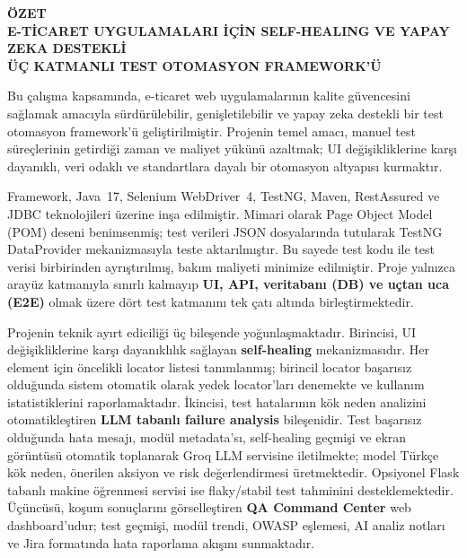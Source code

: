 
{}
\begin{center}
\textbf{\large ÖZET}\\[0.4em]
\textbf{E-TİCARET UYGULAMALARI İÇİN SELF-HEALING VE YAPAY ZEKA DESTEKLİ\\
ÜÇ KATMANLI TEST OTOMASYON FRAMEWORK'Ü}
\end{center}

Bu çalışma kapsamında, e-ticaret web uygulamalarının kalite güvencesini sağlamak amacıyla sürdürülebilir, genişletilebilir ve yapay zeka destekli bir test otomasyon framework'ü geliştirilmiştir. Projenin temel amacı, manuel test süreçlerinin getirdiği zaman ve maliyet yükünü azaltmak; UI değişikliklerine karşı dayanıklı, veri odaklı ve standartlara dayalı bir otomasyon altyapısı kurmaktır.

Framework, Java~17, Selenium WebDriver~4, TestNG, Maven, RestAssured ve JDBC teknolojileri üzerine inşa edilmiştir. Mimari olarak Page Object Model (POM) deseni benimsenmiş; test verileri JSON dosyalarında tutularak TestNG DataProvider mekanizmasıyla teste aktarılmıştır. Bu sayede test kodu ile test verisi birbirinden ayrıştırılmış, bakım maliyeti minimize edilmiştir. Proje yalnızca arayüz katmanıyla sınırlı kalmayıp \textbf{UI, API, veritabanı (DB) ve uçtan uca (E2E)} olmak üzere dört test katmanını tek çatı altında birleştirmektedir.

Projenin teknik ayırt ediciliği üç bileşende yoğunlaşmaktadır. Birincisi, UI değişikliklerine karşı dayanıklılık sağlayan \textbf{self-healing} mekanizmasıdır. Her element için öncelikli locator listesi tanımlanmış; birincil locator başarısız olduğunda sistem otomatik olarak yedek locator'ları denemekte ve kullanım istatistiklerini raporlamaktadır. İkincisi, test hatalarının kök neden analizini otomatikleştiren \textbf{LLM tabanlı failure analysis} bileşenidir. Test başarısız olduğunda hata mesajı, modül metadata'sı, self-healing geçmişi ve ekran görüntüsü otomatik toplanarak Groq LLM servisine iletilmekte; model Türkçe kök neden, önerilen aksiyon ve risk değerlendirmesi üretmektedir. Opsiyonel Flask tabanlı makine öğrenmesi servisi ise flaky/stabil test tahminini desteklemektedir. Üçüncüsü, koşum sonuçlarını görselleştiren \textbf{QA Command Center} web dashboard'udur; test geçmişi, modül trendi, OWASP eşlemesi, AI analiz notları ve Jira formatında hata raporlama akışını sunmaktadır.

